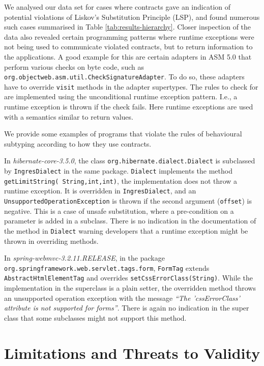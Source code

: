 \documentclass[a4paper,UKenglish]{lipics-v2016}
\begin{document}
We analysed our data set for cases where contracts gave an indication of potential violations of Liskov's Substitution Principle (LSP), and found numerous such cases summarised in Table \ref{tab:results-hierarchy}. Closer inspection of the data also revealed certain programming patterns where runtime exceptions were not being used to communicate violated contracts, but to return information to the applications. A good example for this are certain adapters in ASM 5.0 that perform various checks on byte code, such as \texttt{org.object\-web.asm.util.CheckSignatureAdapter}. To do so, these adapters have to override \texttt{visit} methods in the adapter supertypes. The rules to check for are implemented using the unconditional runtime exception pattern. I.e., a runtime exception is thrown if the check fails. Here runtime exceptions are used with a semantics similar to return values. 



We provide some examples of programs that violate the rules of behavioural subtyping according to how they use contracts.

In \textit{hibernate-core-3.5.0}, the class \texttt{org.\-hi\-ber\-nate.dialect.Dialect} is subclassed by \texttt{IngresDialect} in the same package. \texttt{Dia\-lect} implements the method \texttt{get\-Limit\-String( String,\-int,\-int)}, the im\-plementation does not throw a runtime exception. It is overridden in \texttt{IngresDialect}, and an \texttt{UnsupportedOperationException} is thrown if the second argument (\texttt{offset}) is negative. This is a case of unsafe substitution, where a pre-condition on a parameter is added in a subclass. There is no indication in the documentation of the method in \texttt{Dialect} warning developers that a runtime exception might be thrown in overriding methods.

In \textit{spring-webmvc-3.2.11.RELEASE}, in the package \texttt{org.springframework.web.serv\-let.tags.\-form}, \texttt{Form\-Tag} extends \texttt{Abstract\-Html\-Element\-Tag} and overrides \texttt{set\-Css\-Error\-Class(String)}. While the implementation in the superclass is a plain setter, the overridden method throws an unsupported operation exception with the message \textit{``The 'cssErrorClass' attribute is not supported for forms''}. There is again no indication in the super class that some subclasses might not support this method.




\section{Limitations and Threats to Validity} 
\end{document}
